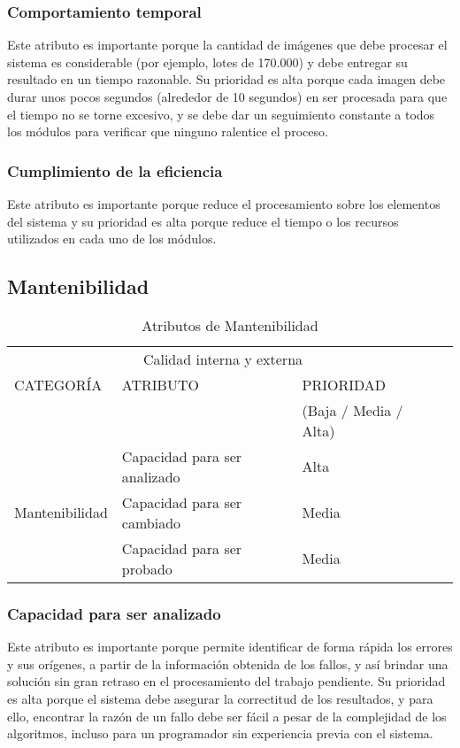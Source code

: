 \documentclass[12pt]{article}
\begin{document}
\subsubsection{Comportamiento temporal}
\vspace*{0.2in}
Este atributo es importante porque la cantidad de imágenes que debe procesar el sistema es considerable (por ejemplo, lotes de 170.000) y debe entregar su resultado en un tiempo razonable. Su prioridad es alta porque cada imagen debe durar unos pocos segundos (alrededor de 10 segundos) en ser procesada para que el tiempo no se torne excesivo, y se debe dar un seguimiento constante a todos los módulos para verificar que ninguno ralentice el proceso.
\subsubsection{Cumplimiento de la eficiencia}
\vspace*{0.2in}
Este atributo es importante porque reduce el procesamiento sobre los elementos del sistema y su prioridad es alta porque reduce el tiempo o los recursos utilizados en cada uno de los módulos.\\[3 cm]

\vspace*{0.3in}

\subsection{Mantenibilidad}
\vspace*{0.3in}
\begin{table}[htb]%
\centering
\begin{tabular}{|l|l|l|l|}
\hline
\multicolumn{3}{|c|}{Calidad interna y externa   } \\
\cline{1-3}
CATEGORÍA & ATRIBUTO & PRIORIDAD\\ & & (Baja / Media / Alta)\\
\hline \hline
\multirow{3}{3cm}{Mantenibilidad} & Capacidad para ser analizado & Alta \\ \cline{2-3}
& Capacidad para ser cambiado &  Media\\ \cline{2-3}
& Capacidad para ser probado & Media\\ \cline{1-3}
\end{tabular}
\caption{Atributos de Mantenibilidad}
\label{tabla:final}
\end{table}%
\subsubsection{Capacidad para ser analizado}
\vspace*{0.2in}
Este atributo es importante porque permite identificar de forma rápida los errores y sus orígenes, a partir de la información obtenida de los fallos, y así brindar una solución sin gran retraso en el procesamiento del trabajo pendiente. Su prioridad es alta porque el sistema debe asegurar la correctitud de los resultados, y para ello, encontrar la razón de un fallo debe ser fácil a pesar de la complejidad de los algoritmos, incluso para un programador sin experiencia previa con el sistema.
\end{document}
